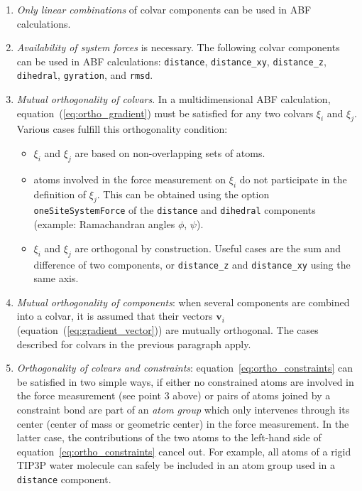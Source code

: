 \begin{enumerate}
 \item \emph{Only linear combinations} of colvar components can be used in ABF calculations.
 \item \emph{Availability of system forces} is necessary. The following colvar components
can be used in ABF calculations:
\texttt{distance}, \texttt{distance\_xy}, \texttt{distance\_z}, \texttt{dihedral},
\texttt{gyration}, and \texttt{rmsd}.
 \item \emph{Mutual orthogonality of colvars}. In a multidimensional ABF calculation,
equation~(\ref{eq:ortho_gradient}) must be satisfied for any two colvars $\xi_i$ and $\xi_j$.
Various cases fulfill this orthogonality condition:
\begin{itemize}
 \item $\xi_i$ and $\xi_j$ are based on non-overlapping sets of atoms.
 \item atoms involved in the force measurement on $\xi_i$ do not participate in
the definition of $\xi_j$. This can be obtained using the option \texttt{oneSiteSystemForce}
of the \texttt{distance} and \texttt{dihedral} components (example: Ramachandran angles $\phi$, $\psi$).
 \item $\xi_i$ and $\xi_j$ are orthogonal by construction. Useful cases are the sum and
difference of two components, or \texttt{distance\_z} and \texttt{distance\_xy} using the same axis.
\end{itemize}
 \item \emph{Mutual orthogonality of components}: when several components are combined into a colvar,
it is assumed that their vectors $\bm{v}_i$ (equation~(\ref{eq:gradient_vector}))
are mutually orthogonal. The cases described for colvars in the previous paragraph apply.
 \item \emph{Orthogonality of colvars and constraints}: equation~\ref{eq:ortho_constraints} can
be satisfied in two simple ways, if either no constrained atoms are involved in the force measurement
(see point 3 above) or pairs of atoms joined by a constraint bond are part of an \textit{atom group}
which only intervenes through its center (center of mass or geometric center) in the force measurement.
In the latter case, the contributions of the two atoms to the left-hand side of equation~\ref{eq:ortho_constraints}
cancel out. For example, all atoms of a rigid TIP3P water molecule can safely be included in an atom
group used in a \texttt{distance} component.
\end{enumerate}


